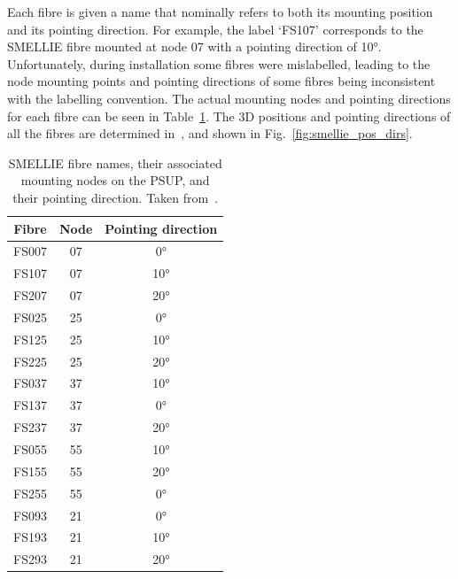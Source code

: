 Each fibre is given a name that nominally refers to both its mounting position and its pointing direction. For example, the label `FS107' corresponds to the SMELLIE fibre mounted at node 07 with a pointing direction of \ang{10}. Unfortunately, during installation some fibres were mislabelled, leading to the node mounting points and pointing directions of some fibres being inconsistent with the labelling convention. The actual mounting nodes and pointing directions for each fibre can be seen in Table~\ref{tab:smellie_fibre_labellings}.
The 3D positions and pointing directions of all the fibres are determined in~\cite{langrockMeasurementRayleighScattering2016}, and shown in Fig.~\ref{fig:smellie_pos_dirs}.

\begin{table}
    \centering
    \begin{tabular}{c c c}
        \hline
        Fibre   & Node & Pointing direction \\ \hline \hline
        FS007   & 07   & \ang{0}  \\
        FS107   & 07   & \ang{10} \\
        FS207   & 07   & \ang{20} \\
        FS025   & 25   & \ang{0}  \\
        FS125   & 25   & \ang{10} \\
        FS225   & 25   & \ang{20} \\
        FS037   & 37   & \ang{10} \\
        FS137   & 37   & \ang{0}  \\
        FS237   & 37   & \ang{20} \\
        FS055   & 55   & \ang{10} \\
        FS155   & 55   & \ang{20} \\
        FS255   & 55   & \ang{0}  \\
        FS093   & 21   & \ang{0}  \\
        FS193   & 21   & \ang{10} \\
        FS293   & 21   & \ang{20} \\
        \hline
    \end{tabular}
    \caption[SMELLIE fibre names, their associated mounting nodes on the PSUP, and their pointing direction.]
    {SMELLIE fibre names, their associated mounting nodes on the PSUP, and their pointing direction. Taken from~\cite{turnerMeasurementScatteringCharacteristics2022}.}
    \label{tab:smellie_fibre_labellings}
\end{table}

